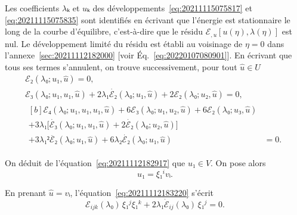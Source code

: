 \documentclass[12pt, final]{amsart}
\begin{document}
Les coefficients \(λ ₖ\) et \(uₖ\) des développements~\eqref{eq:20211115075817}
et \eqref{eq:20211115075835} sont identifiés en écrivant que l'énergie est
stationnaire le long de la courbe d'équilibre, c'est-à-dire que le résidu
\(ℰ_{,u}[u(η), λ(η)]\) est nul. Le développement limité du résidu est établi au
voisinage de \(η=0\) dans l'annexe~\ref{sec:20211112182000} [voir
Éq.~\eqref{eq:20220107080901}]. En écrivant que tous ses termes s'annulent, on
trouve successivement, pour tout \(\hat{u}∈ U\)
\begin{gather}
  \label{eq:20211112182917}
  ℰ₂(λ₀; u₁, \hat{u})=0,\\
  \label{eq:20211112183220}
  ℰ₃(λ₀; u₁, u₁, \hat{u})+2λ₁\dot{ℰ₂}(λ₀; u₁, \hat{u})+2ℰ₂(λ₀; u₂, \hat{u})=0,\\
  \label{eq:20220114135717}
  \begin{aligned}[b]
    ℰ₄(λ₀; u₁, u₁, u₁, \hat{u})+6ℰ₃(λ₀; u₁, u₂, \hat{u})+6ℰ₂(λ₀; u₃, \hat{u})&\\
    +3λ₁\bigl[\dot{ℰ₃}(λ₀; u₁, u₁, \hat{u})+2\dot{ℰ₂}(λ₀; u₂, \hat{u})\bigr]&\\
    +3λ₁²\ddot{ℰ₂}(λ₀; u₁, \hat{u})
    +6λ₂\dot{ℰ₂}(λ₀; u₁, \hat{u})&=0.
  \end{aligned}
\end{gather}

On déduit de l'équation~\eqref{eq:20211112182917} que \(u₁∈V\). On pose alors
\begin{equation}
  \label{eq:20220124135236}
  u₁=ξ₁^i vᵢ.
\end{equation}

En prenant \(\hat{u}=vᵢ\), l'équation~\eqref{eq:20211112183220} s'écrit
\begin{equation}
  \label{eq:20220216140121}
  ℰ_{ijk}(λ₀)\,ξ₁^jξ₁^k+2λ₁\dot{ℰ}_{ij}(λ₀)\,ξ₁^j=0.
\end{equation}
\end{document}
